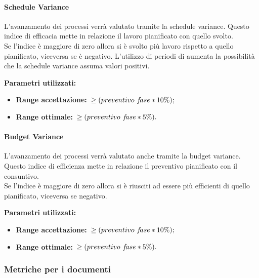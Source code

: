 			\paragraph{Schedule Variance}
			\label{sec:3.7.1.2}
				L'avanzamento dei processi verrà valutato tramite la schedule variance. Questo indice di efficacia mette in relazione il lavoro pianificato con quello svolto. \\
				Se l'indice è maggiore di zero allora si è svolto più lavoro rispetto a quello pianificato, viceversa se è negativo. L'utilizzo di periodi di  aumenta la possibilità che la schedule variance assuma valori positivi.
				
				\textbf{Parametri utilizzati:}
				\begin{itemize}
					\item \textbf{Range accettazione:}\ $\ge\-(preventivo\,\, f\!ase*10\%);$
					\item \textbf{Range ottimale:}\ $\ge\-(preventivo\,\, f\!ase*5\%).$
				\end{itemize}
			\paragraph{Budget Variance}
			\label{sec:3.7.1.3}
				L'avanzamento dei processi verrà valutato anche tramite la budget variance. Questo indice di efficienza mette in relazione il preventivo pianificato con il consuntivo. \\
				Se l'indice è maggiore di zero allora si è riusciti ad essere più efficienti di quello pianificato, viceversa se negativo.
				
				\textbf{Parametri utilizzati:}
				\begin{itemize}
					\item \textbf{Range accettazione:}\ $\ge\-(preventivo\,\, f\!ase*10\%);$
					\item \textbf{Range ottimale:}\ $\ge\-(preventivo\,\, f\!ase*5\%).$
				\end{itemize}
		\subsubsection{Metriche per i documenti}
		\label{sec:3.7.2}
